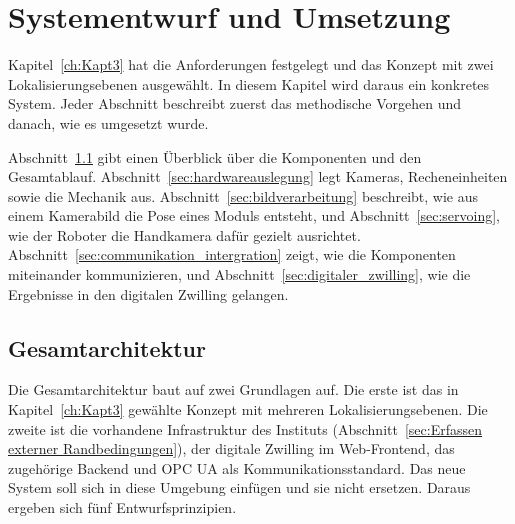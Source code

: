 
\graphicspath{{Bilder/Kap4/}}
\cleardoublepage

\chapter{Systementwurf und Umsetzung}
\label{ch:Systementwurf}
Kapitel~\ref{ch:Kapt3} hat die Anforderungen festgelegt und das Konzept mit zwei Lokalisierungsebenen ausgewählt. In diesem Kapitel wird daraus ein konkretes System. Jeder Abschnitt beschreibt zuerst das methodische Vorgehen und danach, wie es umgesetzt wurde.

Abschnitt~\ref{sec:gesamtarchitektur} gibt einen Überblick über die Komponenten und den Gesamtablauf. Abschnitt~\ref{sec:hardwareauslegung} legt Kameras, Recheneinheiten sowie die Mechanik aus. Abschnitt~\ref{sec:bildverarbeitung} beschreibt, wie aus einem Kamerabild die Pose eines Moduls entsteht, und Abschnitt~\ref{sec:servoing}, wie der Roboter die Handkamera dafür gezielt ausrichtet. Abschnitt~\ref{sec:communikation_intergration} zeigt, wie die Komponenten miteinander kommunizieren, und Abschnitt~\ref{sec:digitaler_zwilling}, wie die Ergebnisse in den digitalen Zwilling gelangen.

\section{Gesamtarchitektur}
\label{sec:gesamtarchitektur}
Die Gesamtarchitektur baut auf zwei Grundlagen auf. Die erste ist das in Kapitel~\ref{ch:Kapt3} gewählte Konzept mit mehreren Lokalisierungsebenen. Die zweite ist die vorhandene Infrastruktur des Instituts (Abschnitt~\ref{sec:Erfassen externer Randbedingungen}), der digitale Zwilling im Web-Frontend, das zugehörige Backend und OPC UA als Kommunikationsstandard. Das neue System soll sich in diese Umgebung einfügen und sie nicht ersetzen. Daraus ergeben sich fünf Entwurfsprinzipien.


